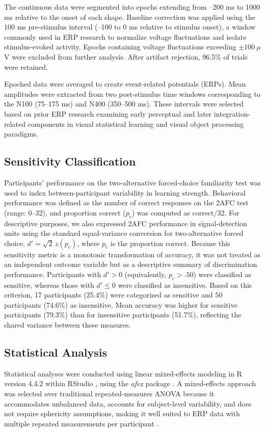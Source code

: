 The continuous data were segmented into epochs extending from –200 ms to 1000 ms relative to the onset of each shape. Baseline correction was applied using the 100 ms pre-stimulus interval (–100 to 0 ms relative to stimulus onset), a window commonly used in ERP research to normalize voltage fluctuations and isolate stimulus-evoked activity. Epochs containing voltage fluctuations exceeding $\pm100~\mu$V were excluded from further analysis. After artifact rejection, 96.5\% of trials were retained.

Epoched data were averaged to create event-related potentials (ERPs). Mean amplitudes were extracted from two post-stimulus time windows corresponding to the N100 (75--175 ms) and N400 (350--500 ms). These intervals were selected based on prior ERP research examining early perceptual and later integration-related components in visual statistical learning and visual object processing paradigms.


\subsection*{Sensitivity Classification}
Participants’ performance on the two-alternative forced-choice familiarity test was used to index between-participant variability in learning strength. Behavioral performance was defined as the number of correct responses on the 2AFC test (range: 0--32), and proportion correct ($p_c$) was computed as correct/32. For descriptive purposes, we also expressed 2AFC performance in signal-detection units using the standard equal-variance conversion for two-alternative forced choice, $d' = \sqrt{2}\, z(p_c)$, where $p_c$ is the proportion correct. Because this sensitivity metric is a monotonic transformation of accuracy, it was not treated as an independent outcome variable but as a descriptive summary of discrimination performance. Participants with $d' > 0$ (equivalently, $p_c > .50$) were classified as sensitive, whereas those with $d' \leq 0$ were classified as insensitive. Based on this criterion, 17 participants (25.4\%) were categorized as sensitive and 50 participants (74.6\%) as insensitive. Mean accuracy was higher for sensitive participants (79.3\%) than for insensitive participants (51.7\%), reflecting the shared variance between these measures.

\subsection*{Statistical Analysis}
Statistical analyses were conducted using linear mixed-effects modeling in R version 4.4.2 \cite{rcoreteamLanguageEnvironmentStatistical2024} within RStudio \cite{rstudioteamRStudioIntegratedDevelopment2024}, using the \textit{afex} package \cite{singmannAfexAnalysisFactorial2024}. A mixed-effects approach was selected over traditional repeated-measures ANOVA because it accommodates unbalanced data, accounts for subject-level variability, and does not require sphericity assumptions, making it well suited to ERP data with multiple repeated measurements per participant \cite{tremblayModelingNonlinearRelationships2015, barrRandomEffectsStructure2013, mageziLinearMixedeffectsModels2015}.


